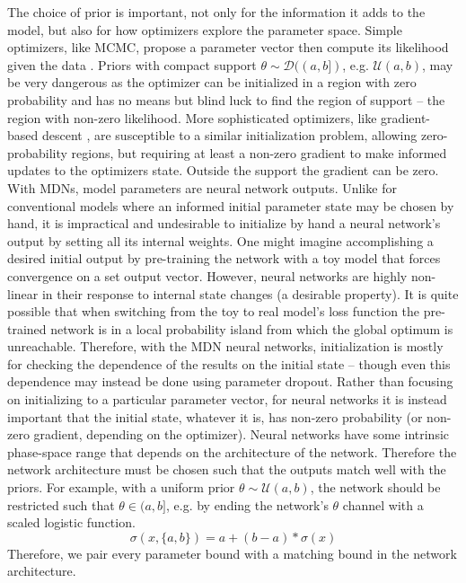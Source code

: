 \documentclass[twocolumn]{aastex631}
\newcommand{\mcal}[1]{\mathcal{#1}}
\begin{document}
            The choice of prior is important, not only for the information it
            adds to the model, but also for how optimizers explore the parameter
            space. Simple optimizers, like MCMC, propose a parameter vector then
            compute its likelihood given the data
            \citep{HoggForeman-Mackey2018}. Priors with compact support  $\theta
            \sim \mcal{D}((a, b])$, e.g.  $\mcal{U}(a, b)$, may be very
            dangerous as the optimizer can be initialized in a region with zero
            probability and has no means but blind luck to find the region of
            support -- the region with non-zero likelihood. More sophisticated
            optimizers, like gradient-based descent \citep{cauchy_2009}, are
            susceptible to a similar initialization problem, allowing
            zero-probability regions, but requiring at least a non-zero gradient
            to make informed updates to the optimizers state.  Outside the
            support the gradient can be zero.  With MDNs, model parameters are
            neural network outputs. Unlike for conventional models where an
            informed initial parameter state may be chosen by hand, it is
            impractical and undesirable to initialize by hand a neural network's
            output by setting all its internal weights. One might imagine
            accomplishing a desired initial output by pre-training the network
            with a toy model that forces convergence on a set output vector.
            However, neural networks are highly non-linear in their response to
            internal state changes (a desirable property). It is quite possible
            that when switching from the toy to real model's loss function the
            pre-trained network is in a local probability island from which the
            global optimum is unreachable.  
            Therefore, with the MDN neural networks, initialization is mostly
            for checking the dependence of the results on the initial state --
            though even this dependence may instead be done using parameter
            dropout. Rather than focusing on initializing to a particular
            parameter vector, for neural networks it is instead important that
            the initial state, whatever it is, has non-zero probability (or
            non-zero gradient, depending on the optimizer).  Neural networks
            have some intrinsic phase-space range that depends on the
            architecture of the network. Therefore the network architecture must
            be chosen such that the outputs match well with the priors. For
            example, with a uniform prior $\theta \sim \mcal{U}(a,b)$, the
            network should be restricted such that $\theta \in (a, b]$, e.g. by
            ending the network's $\theta$ channel with a scaled logistic
            function.
            \begin{equation}\label{eq:scaled_logistic}
                  \sigma(x, \{a,b\}) = a + (b - a) * \sigma(x)
            \end{equation}
            Therefore, we pair every parameter bound with a matching bound in
            the network architecture.
\end{document}
